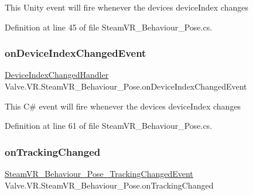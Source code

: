 This Unity event will fire whenever the device\textquotesingle{}s device\+Index changes 



Definition at line 45 of file Steam\+V\+R\+\_\+\+Behaviour\+\_\+\+Pose.\+cs.

\mbox{\label{class_valve_1_1_v_r_1_1_steam_v_r___behaviour___pose_a9dd0fe73f508419122ed56d737d78123}} 
\subsubsection{\texorpdfstring{onDeviceIndexChangedEvent}{onDeviceIndexChangedEvent}}
{\footnotesize\ttfamily \mbox{\hyperlink{class_valve_1_1_v_r_1_1_steam_v_r___behaviour___pose_ac81003e896ac2766c36b5c7a3438ef7f}{Device\+Index\+Changed\+Handler}} Valve.\+V\+R.\+Steam\+V\+R\+\_\+\+Behaviour\+\_\+\+Pose.\+on\+Device\+Index\+Changed\+Event}



This C\# event will fire whenever the device\textquotesingle{}s device\+Index changes 



Definition at line 61 of file Steam\+V\+R\+\_\+\+Behaviour\+\_\+\+Pose.\+cs.

\mbox{\label{class_valve_1_1_v_r_1_1_steam_v_r___behaviour___pose_ab6c888d7509d753ee3542eac9de67f85}} 
\subsubsection{\texorpdfstring{onTrackingChanged}{onTrackingChanged}}
{\footnotesize\ttfamily \mbox{\hyperlink{class_valve_1_1_v_r_1_1_steam_v_r___behaviour___pose___tracking_changed_event}{Steam\+V\+R\+\_\+\+Behaviour\+\_\+\+Pose\+\_\+\+Tracking\+Changed\+Event}} Valve.\+V\+R.\+Steam\+V\+R\+\_\+\+Behaviour\+\_\+\+Pose.\+on\+Tracking\+Changed}



